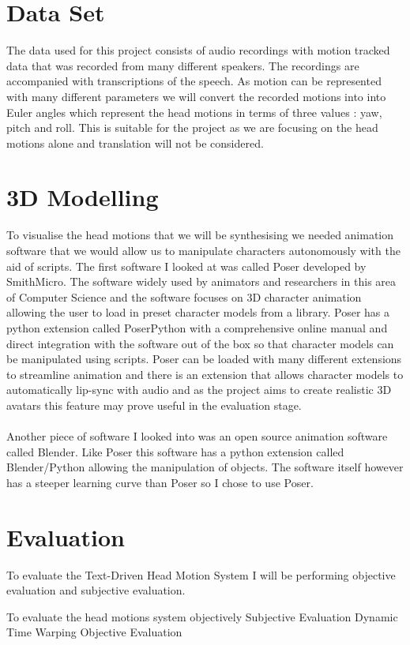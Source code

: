 \documentclass[bsc,frontabs,twoside,singlespacing,parskip]{infthesis}     %
\begin{document}
\section{Data Set}
The data used for this project consists of audio recordings with motion tracked data that was recorded from many different speakers. The recordings are accompanied with transcriptions of the speech. As motion can be represented with many different parameters we will convert the recorded motions into into Euler angles which represent the head motions in terms of three values : yaw, pitch and roll. This is suitable for the project as we are focusing on the head motions alone and translation will not be considered.
\section{3D Modelling}
To visualise the head motions that we will be synthesising we needed animation software that we would allow us to manipulate characters autonomously with the aid of scripts. The first software I looked at was called Poser developed by SmithMicro. The software widely used by animators and researchers in this area of Computer Science and the software focuses on 3D character animation allowing the user to load in preset character models from a library. Poser has a python extension called PoserPython with a comprehensive online manual and direct integration with the software out of the box so that character models can be manipulated using scripts. Poser can be loaded with many different extensions to streamline animation and there is an extension that allows character models to automatically lip-sync with audio and as the project aims to create realistic 3D avatars this feature may prove useful in the evaluation stage.
\\
\\
Another piece of software I looked into was an open source animation software called Blender. Like Poser this software has a python extension called Blender/Python allowing the manipulation of objects. The software itself however has a steeper learning curve than Poser so I chose to use Poser.
\section{Evaluation}
To evaluate the Text-Driven Head Motion System I will be performing objective evaluation and subjective evaluation.

To evaluate the head motions system objectively 
Subjective Evaluation 
Dynamic Time Warping
Objective Evaluation
\end{document}

